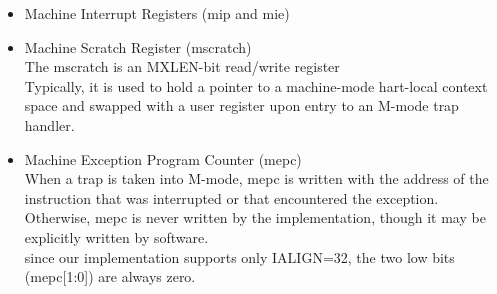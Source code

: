 \documentclass[../main.tex]{subfiles}
\begin{document}
\begin{itemize}
\begin{itemize}
            \item Machine Interrupt Registers (mip and mie)\\
            
            \item Machine Scratch Register (mscratch)\\
            The mscratch is an MXLEN-bit read/write register\\
            Typically, it is used to hold a pointer to a machine-mode hart-local context space and swapped with a user register upon entry to an M-mode trap handler.\\
            
            \item Machine Exception Program Counter (mepc)\\
            When a trap is taken into M-mode, mepc is written with the address of the instruction that was interrupted or that encountered the exception. Otherwise, mepc is never written by the implementation, though it may be explicitly written by software.\\
            since our implementation supports only IALIGN=32, the two low bits (mepc[1:0]) are always zero.\\
            

\end{itemize}
\end{itemize}
\end{document}
